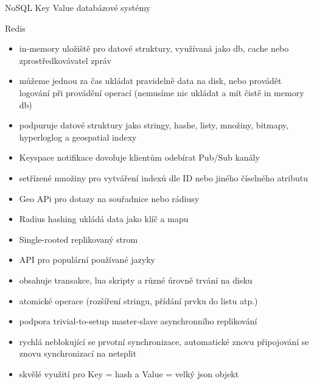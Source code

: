 \documentclass{article}
\begin{document}
\begin{section}{NoSQL Key Value databázové systémy}
		\begin{subsection}{Redis}
			\begin{itemize}
				\item in-memory uložiště pro datové struktury, využívaná jako db, cache nebo zprostředkovávatel zpráv
				\item můžeme jednou za čas ukládat pravidelně data na disk, nebo provádět logování při provádění operací (nemusíme nic ukládat a mít čistě in memory db)
				\item podpuruje datové struktury jako stringy, hashe, listy, množiny, bitmapy, hyperloglog a geospatial indexy
				\item Keyspace notifikace dovoluje klientům odebírat Pub/Sub kanály
				\item setřízené množiny pro vytváření indexů dle ID nebo jiného číselného atributu
				\item Geo APi pro dotazy na souřadnice nebo rádiusy
				\item Radius hashing ukládá data jako klíč a mapu
				\item Single-rooted replikovaný strom
				\item API pro populární používané jazyky
				\item obsahuje transakce, lua skripty a různé úrovně trvání na disku
				\item atomické operace (rozšíření stringu, přídání prvku do listu atp.)
				\item podpora trivial-to-setup master-slave asynchronního replikování
				\item rychlá neblokující se prvotní synchronizace, automatické znovu připojování se znovu synchronizací na netsplit
				\item skvělé využití pro Key = hash a Value = velký json objekt
			\end{itemize}
		\end{subsection}
		

\end{section}
\end{document}
